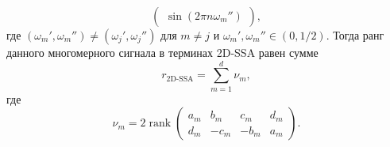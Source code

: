 \documentclass[specialist,
    substylefile = spbu_report.rtx,
    subf,href,colorlinks=true, 12pt]{disser}
\theoremstyle{plain}
\theoremstyle{definition}
\theoremstyle{remark}
\begin{document}
\begin{description}
\[\begin{pmatrix}
                \sin(2\pi n\omega_m'')
            \end{pmatrix},
        \]
        где $(\omega_m', \omega_m'') \ne (\omega_j', \omega_j'')$ для $m\ne j$ и $\omega_m', \omega_m'' \in (0, 1/2)$.
        Тогда ранг данного многомерного сигнала в терминах 2D-SSA равен сумме
        \[
            r_\text{2D-SSA} = \sum_{m=1}^{d} \nu_m,
        \]
        где
        \[
            \nu_m = 2\operatorname{rank}\begin{pmatrix}
                                            a_m & b_m  & c_m  & d_m \\
                                            d_m & -c_m & -b_m & a_m
            \end{pmatrix}.
        \]
    \end{description}
\end{document}
